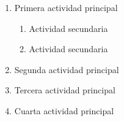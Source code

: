 \begin{enumerate}
  \item Primera actividad principal
  \begin{enumerate}[label*=\arabic*.]
    \item Actividad secundaria
    \item Actividad secundaria
  \end{enumerate}
  \item Segunda actividad principal
  \item Tercera actividad principal
  \item Cuarta actividad principal
\end{enumerate}
